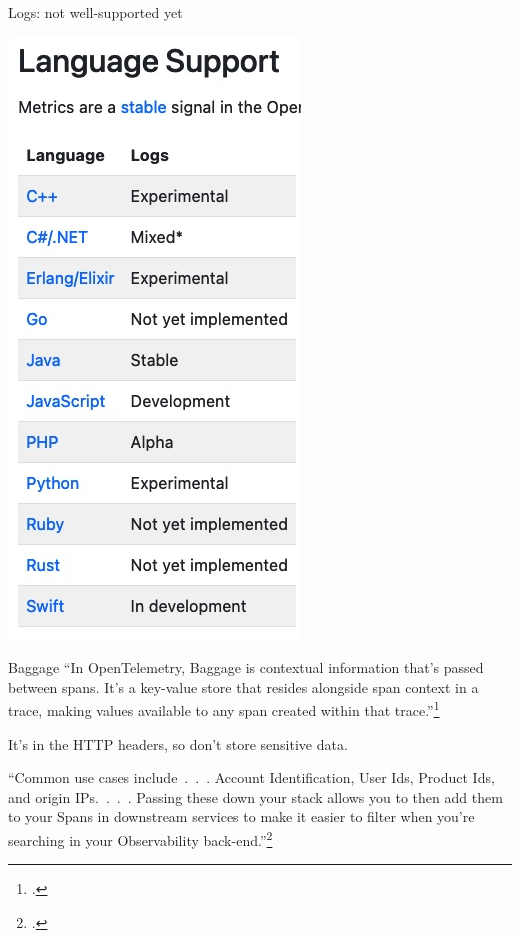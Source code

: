 \documentclass[aspectratio=169]{beamer}
\begin{document}
\begin{frame}{Logs: not well-supported yet}
  \begin{center}
    \includegraphics[height=0.8\textheight]{logs-support.jpg}
  \end{center}
\end{frame}

\begin{frame}{Baggage}
  ``In OpenTelemetry, Baggage is contextual information that's passed between
  spans. It's a key-value store that resides alongside span context in a trace,
  making values available to any span created within that trace.''\footcite{otel-baggage}

  It's in the HTTP headers, so don't store sensitive data.

  ``Common use cases include~.~.~. Account Identification, User Ids, Product
  Ids, and origin IPs.~.~.~.  Passing these down your stack allows you to then
  add them to your Spans in downstream services to make it easier to filter when
  you're searching in your Observability back-end.''\footcite{otel-baggage}
\end{frame}
\end{document}
